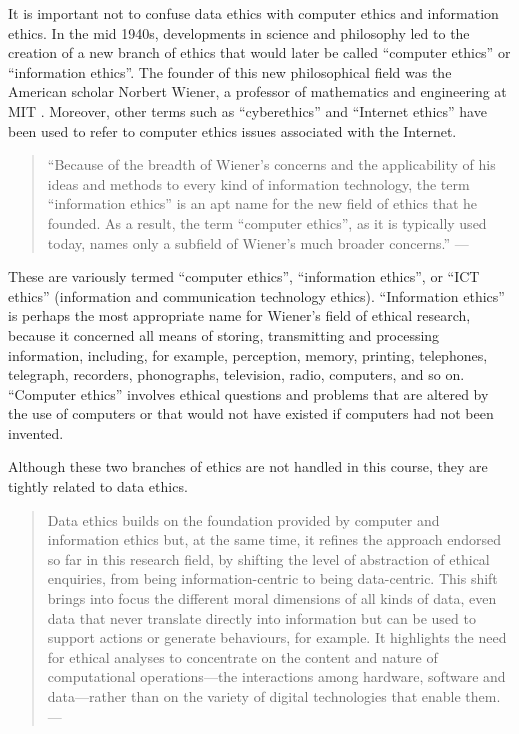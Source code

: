 \documentclass[
]{book}
\begin{document}
It is important not to confuse data ethics with computer ethics and information ethics. In the mid 1940s, developments in science and philosophy led to the creation of a new branch of ethics that would later be called ``computer ethics'' or ``information ethics''. The founder of this new philosophical field was the American scholar Norbert Wiener, a professor of mathematics and engineering at MIT \citep{sep-ethics-computer}. Moreover, other terms such as ``cyberethics'' and ``Internet ethics'' have been used to refer to computer ethics issues associated with the Internet.

\begin{quote}
``Because of the breadth of Wiener's concerns and the applicability of his ideas and methods to every kind of information technology, the term ``information ethics'' is an apt name for the new field of ethics that he founded. As a result, the term ``computer ethics'', as it is typically used today, names only a subfield of Wiener's much broader concerns.'' --- \citep{sep-ethics-computer}
\end{quote}

These are variously termed ``computer ethics'', ``information ethics'', or ``ICT ethics'' (information and communication technology ethics). ``Information ethics'' is
perhaps the most appropriate name for Wiener's field of ethical research, because it concerned all means of storing, transmitting and processing information, including, for example, perception, memory, printing, telephones, telegraph, recorders, phonographs, television, radio, computers, and so on. ``Computer ethics'' involves ethical questions and problems that are altered by the use of computers or that would not have existed if computers had not been invented.

Although these two branches of ethics are not handled in this course, they are tightly related to data ethics.

\begin{quote}
Data ethics builds on the foundation provided by computer and information ethics but, at the same time, it refines the approach endorsed so far in this research field, by shifting the level of abstraction of ethical enquiries, from being information-centric to being data-centric. This shift brings into focus the different moral dimensions of all kinds of data, even data that never translate directly into information but can be used to support actions or generate behaviours, for example. It highlights the need for ethical analyses to concentrate on the content and nature of computational operations---the interactions among hardware, software and data---rather than on the variety of digital technologies that enable them. --- \citep{luciano2016data}
\end{quote}
\end{document}
